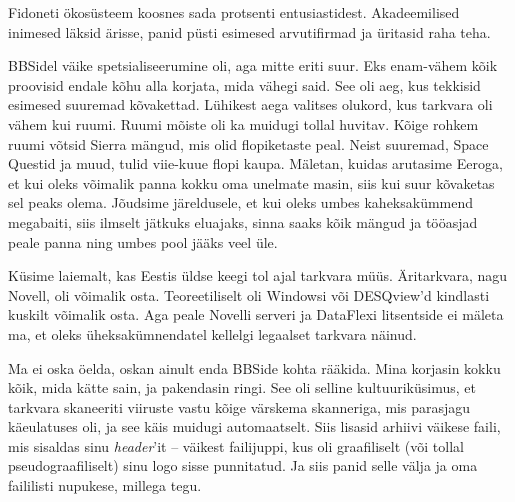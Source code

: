 
Fidoneti ökosüsteem koosnes sada 
protsenti entusiastidest. Akadeemilised inimesed läksid ärisse, panid püsti 
esimesed arvutifirmad ja üritasid raha teha. 


BBSidel väike spetsialiseerumine oli, aga mitte eriti suur. Eks 
enam-vähem kõik proovisid endale kõhu alla korjata, mida vähegi said. 
See oli aeg, kus tekkisid esimesed suuremad kõvakettad. 
Lühikest aega valitses olukord, kus tarkvara 
oli vähem kui ruumi. Ruumi mõiste oli ka muidugi tollal huvitav. Kõige 
rohkem ruumi võtsid Sierra mängud, mis olid flopiketaste peal. Neist suuremad, Space 
Questid ja muud, tulid viie-kuue flopi 
kaupa. Mäletan, kuidas arutasime Eeroga, et 
kui oleks võimalik panna kokku oma unelmate masin, siis kui suur kõvaketas sel 
peaks olema. Jõudsime järeldusele, et kui oleks umbes kaheksakümmend megabaiti, 
siis ilmselt jätkuks eluajaks, sinna saaks kõik mängud ja
tööasjad peale panna ning umbes pool jääks veel üle.


Küsime laiemalt, kas Eestis üldse keegi tol ajal tarkvara müüs. 
Äritarkvara, nagu Novell, oli võimalik osta. Teoreetiliselt oli 
Windowsi või DESQview'd kindlasti kuskilt võimalik osta. Aga peale Novelli serveri ja 
DataFlexi 
litsentside ei mäleta ma, et oleks üheksakümnendatel kellelgi 
legaalset tarkvara näinud. 


Ma ei oska öelda, oskan ainult enda BBSide kohta rääkida. Mina 
korjasin kokku kõik, mida kätte sain, ja pakendasin ringi. See 
oli selline kultuuriküsimus, et tarkvara skaneeriti viiruste vastu 
kõige värskema skanneriga, mis parasjagu käeulatuses oli, ja see käis 
muidugi automaatselt. Siis lisasid arhiivi väikese faili, 
mis sisaldas sinu \emph{header}'it -- väikest 
failijuppi, kus oli graafiliselt (või tollal pseudograafiliselt) sinu 
logo sisse punnitatud. Ja siis panid selle välja ja oma faililisti nupukese, 
millega tegu. 

